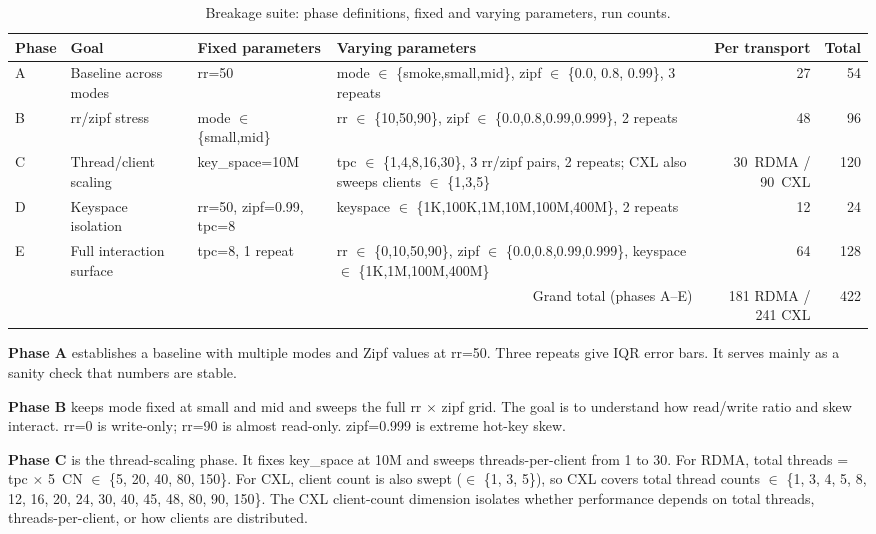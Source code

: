 \documentclass[10pt,twocolumn]{article}
\begin{document}
\begin{table}[t]
\centering
\footnotesize
\caption{Breakage suite: phase definitions, fixed and varying parameters, run counts.}
\label{tab:phases}
\begin{tabular}{llp{3.8cm}p{3.8cm}rr}
\toprule
Phase & Goal & Fixed parameters & Varying parameters & Per transport & Total \\
\midrule
A & Baseline across modes & rr=50 & mode $\in$ \{smoke,small,mid\},
  zipf $\in$ \{0.0, 0.8, 0.99\}, 3 repeats & 27 & 54 \\
B & rr/zipf stress & mode $\in$ \{small,mid\} & rr $\in$ \{10,50,90\},
  zipf $\in$ \{0.0,0.8,0.99,0.999\}, 2 repeats & 48 & 96 \\
C & Thread/client scaling & key\_space=10M & tpc $\in$ \{1,4,8,16,30\},
  3 rr/zipf pairs, 2 repeats; CXL also sweeps clients $\in$ \{1,3,5\}
  & 30~RDMA / 90~CXL & 120 \\
D & Keyspace isolation & rr=50, zipf=0.99, tpc=8 & keyspace $\in$
  \{1K,100K,1M,10M,100M,400M\}, 2 repeats & 12 & 24 \\
E & Full interaction surface & tpc=8, 1 repeat & rr $\in$ \{0,10,50,90\},
  zipf $\in$ \{0.0,0.8,0.99,0.999\}, keyspace $\in$ \{1K,1M,100M,400M\}
  & 64 & 128 \\
\midrule
\multicolumn{4}{r}{Grand total (phases A--E)} & 181 RDMA / 241 CXL & 422 \\
\bottomrule
\end{tabular}
\end{table}

\textbf{Phase A} establishes a baseline with multiple modes and Zipf values at
rr=50.
Three repeats give IQR error bars.
It serves mainly as a sanity check that numbers are stable.

\textbf{Phase B} keeps mode fixed at small and mid and sweeps the full
rr $\times$ zipf grid.
The goal is to understand how read/write ratio and skew interact.
rr=0 is write-only; rr=90 is almost read-only.
zipf=0.999 is extreme hot-key skew.

\textbf{Phase C} is the thread-scaling phase.
It fixes key\_space at 10M and sweeps threads-per-client from 1 to 30.
For RDMA, total threads = tpc $\times$ 5~CN $\in$ \{5, 20, 40, 80, 150\}.
For CXL, client count is also swept ($\in$ \{1, 3, 5\}), so CXL covers
total thread counts $\in$ \{1, 3, 4, 5, 8, 12, 16, 20, 24, 30, 40, 45, 48,
80, 90, 150\}.
The CXL client-count dimension isolates whether performance depends on
total threads, threads-per-client, or how clients are distributed.
\end{document}
